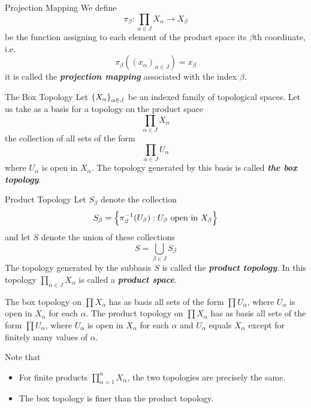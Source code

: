 \documentclass[12pt,a4paper]{article}
\begin{document}
    \begin{defi}{Projection Mapping}
        We define 
        $$
        \pi_\beta:\prod_{\alpha\in J}X_\alpha\to X_\beta
        $$
        be the function assigning to each element of the product space its $\beta$th coordinate, i.e.
        $$
        \pi_\beta((x_\alpha)_{\alpha\in J})=x_\beta
        $$
        it is called the \textbf{\textit{projection mapping}} associated with the index $\beta$.
    \end{defi}
    \hfill

    \begin{defi}{The Box Topology}
        Let $\left\{X_\alpha\right\}_{\alpha\in J}$ be an indexed family of topological spaces. Let us take as a basis for a topology on the product space
        $$
        \prod_{\alpha\in J} X_\alpha
        $$
        the collection of all sets of the form
        $$
        \prod_{\alpha\in J}U_\alpha
        $$
        where $U_\alpha$ is open in $X_\alpha$. The topology generated by this basis is called \textbf{\textit{the box topology}}.
    \end{defi}
    \hfill

    \begin{defi}{Product Topology}
        Let $S_\beta$ denote the collection
        $$
        S_\beta=\left\{\pi_{\beta}^{-1}(U_\beta):U_\beta\text{ open in } X_\beta\right\}
        $$
        and let $S$ denote the union of these collections 
        $$
        S=\bigcup_{\beta\in J}S_\beta
        $$
        The topology generated by the subbasis $S$ is called the \textbf{\textit{product topology}}. In this topology $\prod_{\alpha\in J}X_\alpha$ is called a \textbf{\textit{product space}}.
    \end{defi}
    \hfill

    \begin{thm}
        The box topology on $\prod X_\alpha$ has as basis all sets of the form $\prod U_\alpha$, where $U_\alpha$ is open in $X_\alpha$ for each $\alpha$. The product topology on $\prod X_\alpha$ has as basis all sets of the form $\prod U_\alpha$, where $U_\alpha$ is open in $X_\alpha$ for each $\alpha$ and $U_\alpha$ equals $X_\alpha$ except for finitely many values of $\alpha$.
    \end{thm}
    \begin{remark}
        Note that
        \begin{itemize}
            \item For finite products $\prod_{\alpha=1}^nX_\alpha$, the two topologies are precisely the same.
            \item The box topology is finer than the product topology.
        \end{itemize}
    \end{remark} 
    \hfill
\end{document}
